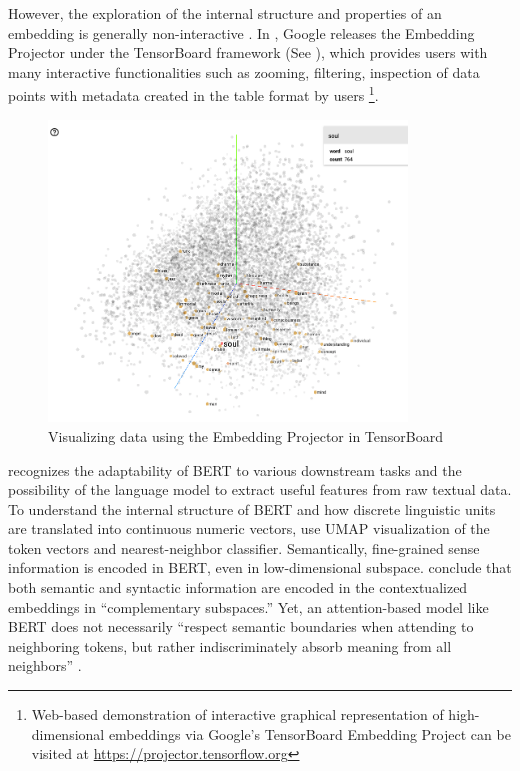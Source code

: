 However, the exploration of the internal structure and properties of an embedding is generally non-interactive \parencite{smilkov2016projector}. In \citeyear{smilkov2016projector}, Google releases the Embedding Projector under the TensorBoard framework (See ), which provides users with many interactive functionalities such as zooming, filtering, inspection of data points with metadata created in the table format by users \parencite{smilkov2016projector}\footnote{Web-based demonstration of interactive graphical representation of high-dimensional embeddings via Google's TensorBoard Embedding Project can be visited at \url{https://projector.tensorflow.org}}.

\begin{figure}[H]
  \centering
  \includegraphics[width=0.85\textwidth,keepaspectratio]{figures_ref/embedding_projector_demo}
  \caption{Visualizing data using the Embedding Projector in TensorBoard} \label{fig:tensorboard_demo}
\end{figure}

\textcite{coenen2019visualizing} recognizes the adaptability of BERT to various downstream tasks and the possibility of the language model to extract useful features from raw textual data. To understand the internal structure of BERT and how discrete linguistic units are translated into continuous numeric vectors, \textcite{coenen2019visualizing} use UMAP visualization of the token vectors and nearest-neighbor classifier. Semantically, fine-grained sense information is encoded in BERT, even in low-dimensional subspace. \textcite{coenen2019visualizing} conclude that both semantic and syntactic information are encoded in the contextualized embeddings in ``complementary subspaces.'' Yet, an attention-based model like BERT does not necessarily ``respect semantic boundaries when attending to neighboring tokens, but rather indiscriminately absorb meaning from all neighbors'' \parencite{coenen2019visualizing}.

